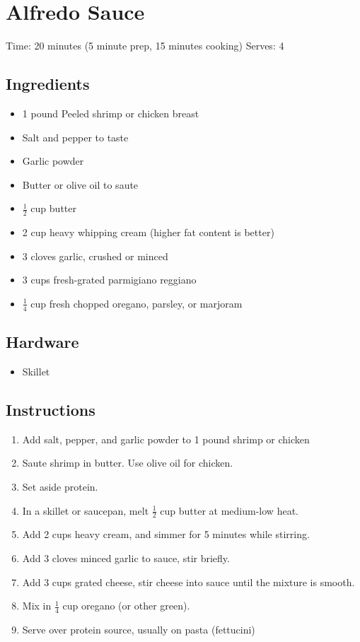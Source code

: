 \section{Alfredo Sauce}
\label{alfredoSauce}
\setcounter{secnumdepth}{0}
Time: 20 minutes (5 minute prep, 15 minutes cooking)
Serves: 4

\begin{multicols}{2}
\subsection*{Ingredients}
\begin{itemize}
    \item 1 pound Peeled shrimp or chicken breast
    \item Salt and pepper to taste
    \item Garlic powder
    \item Butter or olive oil to saute
    \item \( \frac{1}{2} \) cup butter
    \item 2 cup heavy whipping cream (higher fat content is better)
    \item 3 cloves garlic, crushed or minced
    \item 3 cups fresh-grated parmigiano reggiano
    \item \( \frac{1}{4} \) cup fresh chopped oregano, parsley, or marjoram
\end{itemize}

\subsection*{Hardware}
\begin{itemize}
    \item Skillet
\end{itemize}
\clearpage

\subsection*{Instructions}
\begin{enumerate}
    \item Add salt, pepper, and garlic powder to 1 pound shrimp or chicken
    \item Saute shrimp in butter. Use olive oil for chicken.
    \item Set aside protein.
    \item In a skillet or saucepan, melt \( \frac{1}{2} \) cup butter at medium-low heat.
    \item Add 2 cups heavy cream, and simmer for 5 minutes while stirring.
    \item Add 3 cloves minced garlic to sauce, stir briefly.
    \item Add 3 cups grated cheese, stir cheese into sauce until the mixture is smooth.
    \item Mix in \( \frac{1}{4} \) cup oregano (or other green).
    \item Serve over protein source, usually on pasta (fettucini)


\end{enumerate}
\end{multicols}
